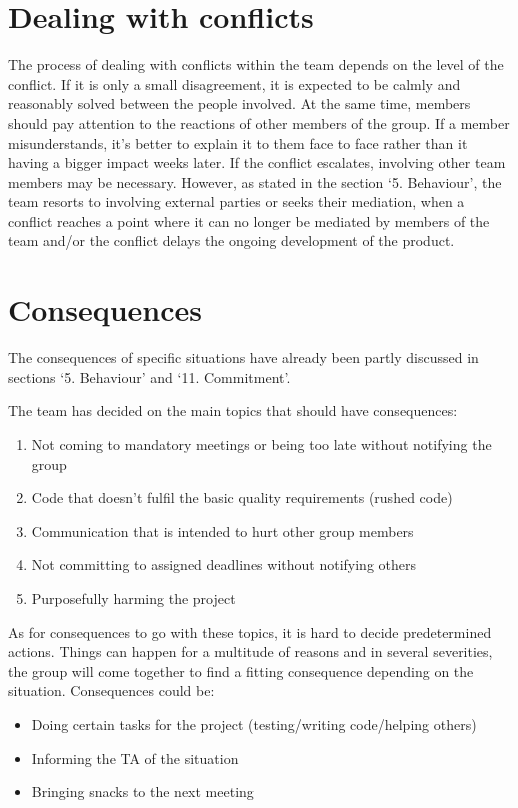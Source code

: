 \documentclass[sigconf,nonacm]{acmart}
\begin{document}
\section{Dealing with conflicts}
The process of dealing with conflicts within the team depends on the level of the conflict. If it is only a small disagreement, it is expected to be calmly and reasonably solved between the people involved. At the same time, members should pay attention to the reactions of other members of the group. If a member misunderstands, it's better to explain it to them face to face rather than it having a bigger impact weeks later. If the conflict escalates, involving other team members may be necessary. However, as stated in the section ‘5. Behaviour’, the team resorts to involving external parties or seeks their mediation, when a conflict reaches a point where it can no longer be mediated by members of the team and/or the conflict delays the ongoing development of the product.


\section{Consequences}
The consequences of specific situations have already been partly discussed in sections ‘5. Behaviour’ and ‘11. Commitment’.

The team has decided on the main topics that should have consequences:
\begin{enumerate}
    \item Not coming to mandatory meetings or being too late without notifying the group
    \item Code that doesn’t fulfil the basic quality requirements (rushed code)
    \item Communication that is intended to hurt other group members
    \item Not committing to assigned deadlines without notifying others
    \item Purposefully harming the project
\end{enumerate}

As for consequences to go with these topics, it is hard to decide predetermined actions. Things can happen for a multitude of reasons and in several severities, the group will come together to find a fitting consequence depending on the situation. Consequences could be:

\begin{itemize}
    \item Doing certain tasks for the project (testing/writing code/helping others)
    \item Informing the TA of the situation
    \item Bringing snacks to the next meeting
\end{itemize}
\end{document}
